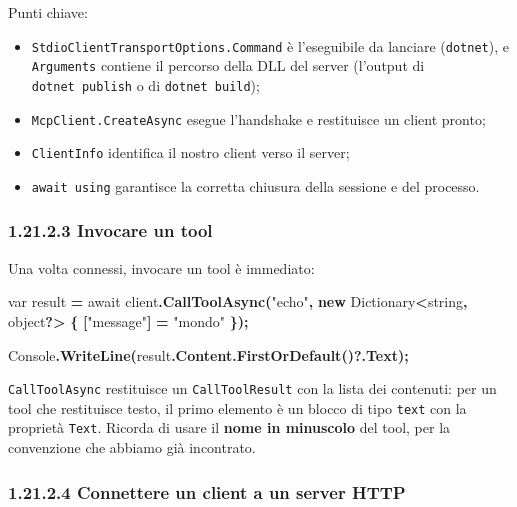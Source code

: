 \documentclass[
  italian,
  10pt,
]{book}
\newenvironment{Shaded}{\begin{snugshade}}{\end{snugshade}}
\newcommand{\DataTypeTok}[1]{\textcolor[rgb]{0.13,0.29,0.53}{#1}}
\newcommand{\FunctionTok}[1]{\textcolor[rgb]{0.13,0.29,0.53}{\textbf{#1}}}
\newcommand{\KeywordTok}[1]{\textcolor[rgb]{0.13,0.29,0.53}{\textbf{#1}}}
\newcommand{\NormalTok}[1]{#1}
\newcommand{\OperatorTok}[1]{\textcolor[rgb]{0.81,0.36,0.00}{\textbf{#1}}}
\newcommand{\StringTok}[1]{\textcolor[rgb]{0.31,0.60,0.02}{#1}}
\providecommand{\tightlist}{%
  \setlength{\itemsep}{0pt}\setlength{\parskip}{0pt}}
\begin{document}
Punti chiave:

\begin{itemize}
\tightlist
\item
  \texttt{StdioClientTransportOptions.Command} è l'eseguibile da
  lanciare (\texttt{dotnet}), e \texttt{Arguments} contiene il percorso
  della DLL del server (l'output di \texttt{dotnet\ publish} o di
  \texttt{dotnet\ build});
\item
  \texttt{McpClient.CreateAsync} esegue l'handshake e restituisce un
  client pronto;
\item
  \texttt{ClientInfo} identifica il nostro client verso il server;
\item
  \texttt{await\ using} garantisce la corretta chiusura della sessione e
  del processo.
\end{itemize}

\subsubsection{1.21.2.3 Invocare un tool}\label{invocare-un-tool}

Una volta connessi, invocare un tool è immediato:

\begin{Shaded}
\begin{Highlighting}[]
\DataTypeTok{var}\NormalTok{ result }\OperatorTok{=}\NormalTok{ await client}\OperatorTok{.}\FunctionTok{CallToolAsync}\OperatorTok{(}\StringTok{"echo"}\OperatorTok{,} \KeywordTok{new}\NormalTok{ Dictionary}\OperatorTok{\textless{}}\DataTypeTok{string}\OperatorTok{,} \DataTypeTok{object}\OperatorTok{?\textgreater{}}
\OperatorTok{\{}
    \OperatorTok{[}\StringTok{"message"}\OperatorTok{]} \OperatorTok{=} \StringTok{"mondo"}
\OperatorTok{\});}

\NormalTok{Console}\OperatorTok{.}\FunctionTok{WriteLine}\OperatorTok{(}\NormalTok{result}\OperatorTok{.}\FunctionTok{Content}\OperatorTok{.}\FunctionTok{FirstOrDefault}\OperatorTok{()?.}\FunctionTok{Text}\OperatorTok{);}
\end{Highlighting}
\end{Shaded}

\texttt{CallToolAsync} restituisce un \texttt{CallToolResult} con la
lista dei contenuti: per un tool che restituisce testo, il primo
elemento è un blocco di tipo \texttt{text} con la proprietà
\texttt{Text}. Ricorda di usare il \textbf{nome in minuscolo} del tool,
per la convenzione che abbiamo già incontrato.

\subsubsection{1.21.2.4 Connettere un client a un server
HTTP}\label{connettere-un-client-a-un-server-http}
\end{document}
